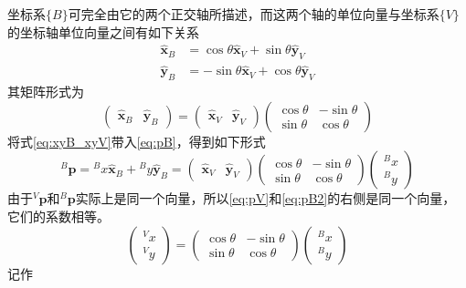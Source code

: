 \documentclass[UTF8,a4paper,10pt]{ctexart}
\begin{document}
坐标系$\{B\}$可完全由它的两个正交轴所描述，而这两个轴的单位向量与坐标系$\{V\}$的坐标轴单位向量之间有如下关系
\begin{align*}
  \hat{\mathbf{x}}_B&=\cos\theta\hat{\mathbf{x}}_V + \sin\theta\hat{\mathbf{y}}_V\\
  \hat{\mathbf{y}}_B&=-\sin\theta\hat{\mathbf{x}}_V + \cos\theta\hat{\mathbf{y}}_V
\end{align*}
其矩阵形式为
\begin{equation}\label{eq:xyB_xyV}
  \begin{pmatrix}\hat{\mathbf{x}}_B&\hat{\mathbf{y}}_B\end{pmatrix}=
  \begin{pmatrix}\hat{\mathbf{x}}_V&\hat{\mathbf{y}}_V\end{pmatrix}
  \begin{pmatrix}\cos\theta  & -\sin\theta\\\sin\theta & \cos\theta\end{pmatrix}
\end{equation}
将式\eqref{eq:xyB_xyV}带入\eqref{eq:pB}，得到如下形式
\begin{equation}\label{eq:pB2}
  {}^B\mathbf{p}={}^Bx\hat{\mathbf{x}}_B + {}^By\hat{\mathbf{y}}_B =
  \begin{pmatrix}\hat{\mathbf{x}}_V&\hat{\mathbf{y}}_V\end{pmatrix}
  \begin{pmatrix}\cos\theta  & -\sin\theta\\\sin\theta & \cos\theta\end{pmatrix}
  \begin{pmatrix}{}^Bx\\{}^By\end{pmatrix}
\end{equation}
由于${}^V\mathbf{p}$和${}^B\mathbf{p}$实际上是同一个向量，所以\eqref{eq:pV}和\eqref{eq:pB2}的右侧是同一个向量，它们的系数相等。
\begin{equation*}
  \begin{pmatrix}{}^Vx\\{}^Vy\end{pmatrix}=
  \begin{pmatrix}\cos\theta  & -\sin\theta\\\sin\theta & \cos\theta\end{pmatrix}
  \begin{pmatrix}{}^Bx\\{}^By\end{pmatrix}
\end{equation*}
记作
\end{document}
